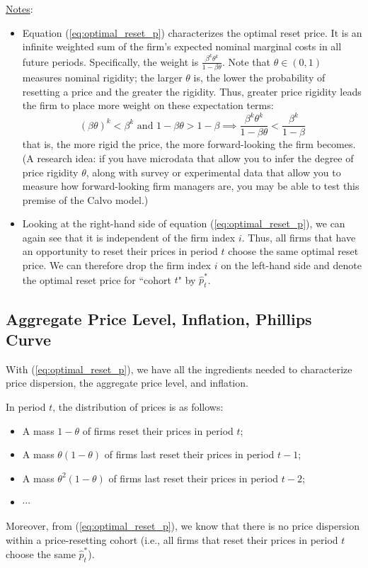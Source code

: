 \documentclass[12pt]{article}
\begin{document}
\underline{Notes}:
\begin{itemize}
		\item Equation (\ref{eq:optimal_reset_p}) characterizes the optimal reset price. It is an infinite weighted sum of the firm's expected nominal marginal costs in all future periods. Specifically, the weight is $\frac{\beta^k \theta^k}{1-\beta \theta}$. Note that $\theta \in (0,1)$ measures nominal rigidity; the larger $\theta$ is, the lower the probability of resetting a price and the greater the rigidity. Thus, greater price rigidity leads the firm to place more weight on these expectation terms:
	\[(\beta \theta)^k < \beta^k \text{ and } 1-\beta \theta > 1- \beta \implies \frac{\beta^k \theta^k}{1-\beta \theta} < \frac{\beta^k}{1-\beta}\]
		that is, the more rigid the price, the more forward-looking the firm becomes. \\
		(A research idea: if you have microdata that allow you to infer the degree of price rigidity $\theta$, along with survey or experimental data that allow you to measure how forward-looking firm managers are, you may be able to test this premise of the Calvo model.)
		\item Looking at the right-hand side of equation (\ref{eq:optimal_reset_p}), we can again see that it is independent of the firm index $i$. Thus, all firms that have an opportunity to reset their prices in period $t$ choose the same optimal reset price. We can therefore drop the firm index $i$ on the left-hand side and denote the optimal reset price for ``cohort $t$" by $\hat{p}_t^*$.
\end{itemize}

\subsection{Aggregate Price Level, Inflation, Phillips Curve }
With (\ref{eq:optimal_reset_p}), we have all the ingredients needed to characterize price dispersion, the aggregate price level, and inflation. 

In period $t$, the distribution of prices is as follows:
\begin{itemize}
		\item A mass $1-\theta$ of firms reset their prices in period $t$;
		\item A mass $\theta (1-\theta)$ of firms last reset their prices in period $t-1$;
		\item A mass $\theta^2 (1-\theta)$ of firms last reset their prices in period $t-2$; 
	\item $\cdots$
\end{itemize}
Moreover, from (\ref{eq:optimal_reset_p}), we know that there is no price dispersion within a price-resetting cohort (i.e., all firms that reset their prices in period $t$ choose the same $\hat{p}_t^*$).
\end{document}
